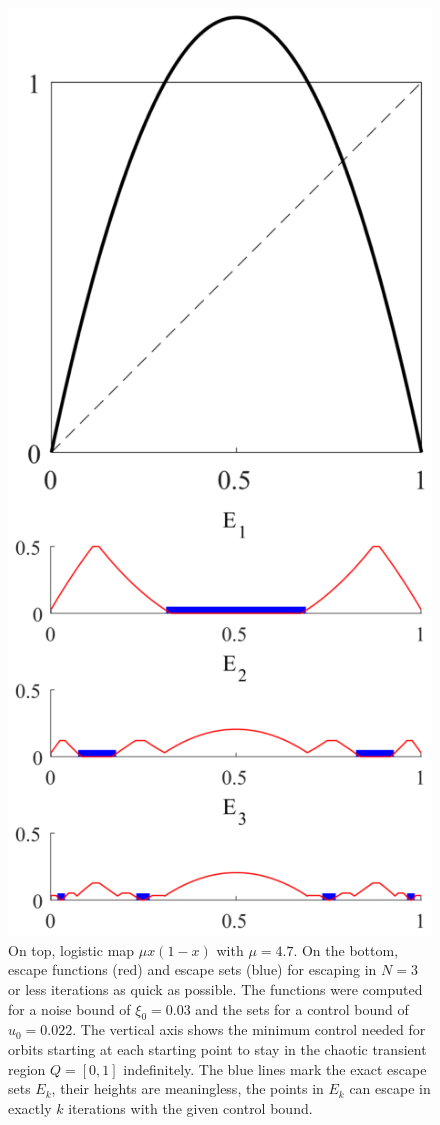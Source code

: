 \begin{figure}
    \centering
    \includegraphics[width=0.4\textheight]{Images/P1/EscapeSetsExact.eps}
    \caption{On top, logistic map $\mu x(1-x)$ with $\mu = 4.7$. On the bottom, escape functions (red) and escape sets (blue) for escaping in $N=3$ or less iterations as quick as possible. The functions were computed for a noise bound of $\xi_0 = 0.03$ and the sets for a control bound of $u_0 = 0.022$. The vertical axis shows the minimum control needed for orbits starting at each starting point to stay in the chaotic transient region $Q = [0,1]$ indefinitely. The blue lines mark the exact escape sets $E_k$, their heights are meaningless, the points in $E_k$ can escape in exactly $k$ iterations with the given control bound. }
    \label{fig:EscapeSetsExact}
\end{figure}




